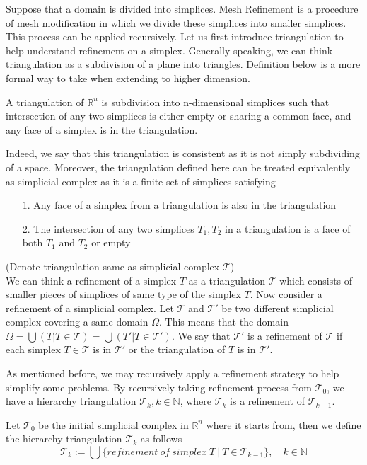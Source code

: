 Suppose that a domain is divided into simplices. Mesh Refinement is a procedure of mesh modification in which we divide these simplices into smaller simplices. This process can be applied recursively. Let us first introduce triangulation to help understand refinement on a simplex. Generally speaking, we can think triangulation as a subdivision of a plane into triangles. Definition below is a more formal way to take when extending to higher dimension.
    \begin{definition*}
    A triangulation of $\mathbb R^n$ is subdivision into n-dimensional simplices such that intersection of any two simplices is either empty or sharing a common face, and any face of a simplex is in the triangulation.
    \end{definition*}
    Indeed, we say that this triangulation is consistent as it is not simply subdividing of a space. Moreover, the triangulation defined here can be treated equivalently as simplicial complex as it is a finite set of simplices satisfying
    \begin{itemize}
        \item[1.] Any face of a simplex from a triangulation is also in the triangulation
        \item[2.] The intersection of any two simplices $T_1, T_2 $ in a triangulation is a face of both $T_1$ and  $T_2$ or empty
    \end{itemize}
    (Denote triangulation same as simplicial complex $\mathcal{T}$)\\
    

    We can think a refinement of a simplex $T$ as a triangulation $\mathcal{T}$ which consists of smaller pieces of simplices of same type of the simplex $T$. Now consider a refinement of a simplicial complex. Let $\mathcal{T}$ and $\mathcal{T'}$ be two different simplicial complex covering a same domain $\Omega$. This means that the domain \(\Omega = \displaystyle \bigcup({T \vert T\in \mathcal{T}}) = \bigcup({T' \vert T\in \mathcal{T'}})\). We say that $\mathcal{T'}$ is a refinement of $\mathcal{T}$ if each simplex $T\in\mathcal{T}$ is in $\mathcal{T'}$ or the triangulation of $T$ is in $\mathcal{T'}$.

    As mentioned before, we may recursively apply a refinement strategy to help simplify some problems. By recursively taking refinement process from $\mathcal{T}_0$, we have a hierarchy triangulation $\mathcal{T}_k, k\in\mathbb{N}$, where $\mathcal{T}_k$ is a refinement of $\mathcal{T}_{k-1}$. 
    \begin{definition*}
    Let $\mathcal{T}_0$ be the initial simplicial complex in $\mathbb{R}^n$ where it starts from, then we define the hierarchy triangulation $\mathcal{T}_k$ as follows
    \begin{equation*}
    \mathcal{T}_k := \bigcup\{refinement~of~simplex~T ~\vert ~T\in\mathcal{T}_{k-1}\}, \quad k\in\mathbb{N}
    \end{equation*}
    \end{definition*}

